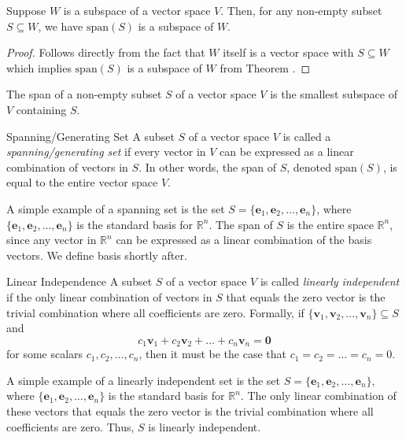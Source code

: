 \documentclass[openany]{book}
\begin{document}
\begin{corollary}
    Suppose $W$ is a subspace of a vector space $V$. Then, for any non-empty subset $S \subseteq W$, we have $\text{span}(S)$ is a subspace of $W$.
\end{corollary}
\begin{proof}
Follows directly from the fact that $W$ itself is a vector space with $S \subseteq W$ which implies $\text{span}(S)$ is a subspace of $W$ from Theorem \themytheorem. 
\end{proof}
\begin{mynote}
The span of a non-empty subset $S$ of a vector space $V$ is the smallest subspace of $V$ containing $S$.
\end{mynote}
\begin{mydefinition}{Spanning/Generating Set}
A subset $S$ of a vector space $V$ is called a \emph{spanning/generating set} if every vector in $V$ can be expressed as a linear combination of vectors in $S$. In other words, the span of $S$, denoted $\text{span}(S)$, is equal to the entire vector space $V$.
\end{mydefinition}
\begin{example}
    A simple example of a spanning set is the set $S = \{ \mathbf{e}_1, \mathbf{e}_2, \ldots, \mathbf{e}_n \}$, where $\{ \mathbf{e}_1, \mathbf{e}_2, \ldots, \mathbf{e}_n \}$ is the standard basis for $\mathbb{R}^n$. The span of $S$ is the entire space $\mathbb{R}^n$, since any vector in $\mathbb{R}^n$ can be expressed as a linear combination of the basis vectors. We define basis shortly after. 
\end{example}
\begin{mydefinition}{Linear Independence}
    A subset $S$ of a vector space $V$ is called \emph{linearly independent} if the only linear combination of vectors in $S$ that equals the zero vector is the trivial combination where all coefficients are zero. Formally, if $\{ \mathbf{v}_1, \mathbf{v}_2, \ldots, \mathbf{v}_n \} \subseteq S$ and
    $$c_1 \mathbf{v}_1 + c_2 \mathbf{v}_2 + \ldots + c_n \mathbf{v}_n = \mathbf{0}$$
    for some scalars $c_1, c_2, \ldots, c_n$, then it must be the case that $c_1 = c_2 = \ldots = c_n = 0$.
\end{mydefinition}
\begin{example}
    A simple example of a linearly independent set is the set $S = \{ \mathbf{e}_1, \mathbf{e}_2, \ldots, \mathbf{e}_n \}$, where $\{ \mathbf{e}_1, \mathbf{e}_2, \ldots, \mathbf{e}_n \}$ is the standard basis for $\mathbb{R}^n$. The only linear combination of these vectors that equals the zero vector is the trivial combination where all coefficients are zero. Thus, $S$ is linearly independent.
\end{example}
\end{document}
